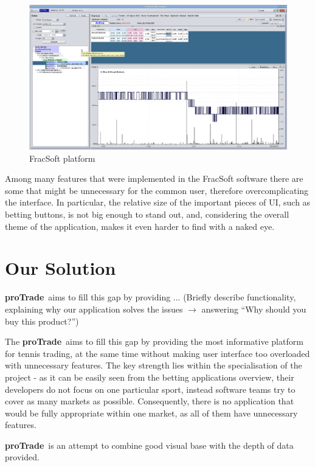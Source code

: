 \documentclass[10pt]{report}
\newcommand{\nm}{{\bf proTrade}}
\newcommand{\nmsp}{{\nm \ }}
\begin{document}
\begin{figure}[h]
\begin{center}
\includegraphics[scale = 0.36]{fracsoft.png}
\end{center}
\caption{FracSoft platform}
\end{figure}

Among many features that were implemented in the FracSoft software there are some that might be unnecessary for the common user, therefore 
overcomplicating the interface. In particular, the relative size of the important pieces of UI, such as betting buttons, is not big enough 
to stand out, and, considering the overall theme of the application, makes it even harder to find with a naked eye.

\section{Our Solution}

\nmsp aims to fill this gap by providing ... (Briefly describe functionality, explaining why our application solves the issues $\rightarrow$ answering ``Why should you buy this product?'')

The \nmsp aims to fill this gap by providing the most informative platform for tennis trading, at the same time without making user interface 
too overloaded with unnecessary features. The key strength lies within the specialisation of the project - as it can be easily seen from the 
betting applications overview, their developers do not focus on one particular sport, instead software teams try to cover as many markets as possible. 
Consequently, there is no application that would be fully appropriate within one market, as all of them have unnecessary features.

\nmsp is an attempt to combine good visual base with the depth of data provided.
\end{document}
